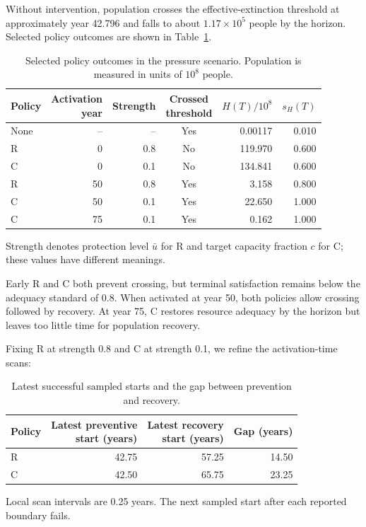\documentclass[12pt,a4paper]{article}
\theoremstyle{remark}
\begin{document}
Without intervention, population crosses the effective-extinction threshold at approximately year 42.796 and falls to about $1.17\times10^5$ people by the horizon. Selected policy outcomes are shown in Table~\ref{tab:policyresults}.

\begin{table}[htbp]\centering\small
\caption{Selected policy outcomes in the pressure scenario. Population is measured in units of $10^8$ people.}\label{tab:policyresults}
\begin{tabular}{@{}lrrcrr@{}}\toprule
Policy & \shortstack{Activation\\year} & Strength & \shortstack{Crossed\\threshold} & $H(T)/10^8$ & $s_H(T)$\\\midrule
None & -- & -- & Yes & 0.00117 & 0.010\\
R & 0 & 0.8 & No & 119.970 & 0.600\\
C & 0 & 0.1 & No & 134.841 & 0.600\\
R & 50 & 0.8 & Yes & 3.158 & 0.800\\
C & 50 & 0.1 & Yes & 22.650 & 1.000\\
C & 75 & 0.1 & Yes & 0.162 & 1.000\\
\bottomrule\end{tabular}
\par\smallskip\begin{minipage}{0.96\linewidth}\footnotesize
Strength denotes protection level $\bar u$ for R and target capacity fraction $c$ for C; these values have different meanings.
\end{minipage}
\end{table}

Early R and C both prevent crossing, but terminal satisfaction remains below the adequacy standard of 0.8. When activated at year 50, both policies allow crossing followed by recovery. At year 75, C restores resource adequacy by the horizon but leaves too little time for population recovery.

Fixing R at strength 0.8 and C at strength 0.1, we refine the activation-time scans:
\begin{table}[H]\centering\small
\caption{Latest successful sampled starts and the gap between prevention and recovery.}\label{tab:deadlines}
\begin{tabular}{@{}lrrr@{}}\toprule
Policy & \shortstack{Latest preventive\\start (years)} & \shortstack{Latest recovery\\start (years)} & Gap (years)\\\midrule
R & 42.75 & 57.25 & 14.50\\
C & 42.50 & 65.75 & 23.25\\
\bottomrule\end{tabular}
\par\smallskip\begin{minipage}{0.96\linewidth}\footnotesize
Local scan intervals are 0.25 years. The next sampled start after each reported boundary fails.
\end{minipage}
\end{table}
\end{document}
